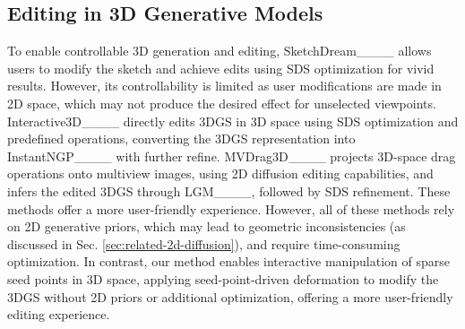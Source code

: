 \subsection{Editing in 3D Generative Models}  
\label{sec: relatd_edit}
To enable controllable 3D generation and editing, SketchDream____ allows users to modify the sketch and achieve edits using SDS optimization for vivid results. However, its controllability is limited as user modifications are made in 2D space, which may not produce the desired effect for unselected viewpoints.  Interactive3D____ directly edits 3DGS in 3D space using SDS optimization and predefined operations, converting the 3DGS representation into InstantNGP____ with further refine. MVDrag3D____ projects 3D-space drag operations onto multiview images, using 2D diffusion editing capabilities, and infers the edited 3DGS through LGM____, followed by SDS refinement. These methods offer a more user-friendly experience. However, all of these methods rely on 2D generative priors, which may lead to geometric inconsistencies (as discussed in Sec. \ref{sec:related-2d-diffusion}), and require time-consuming optimization. In contrast, our method enables interactive manipulation of sparse seed points in 3D space, applying seed-point-driven deformation to modify the 3DGS without 2D priors or additional optimization, offering a more user-friendly editing experience.
